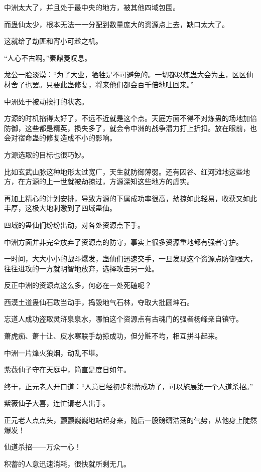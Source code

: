 \begin{this_body}
中洲太大了，并且处于最中央的地方，被其他四域包围。

而蛊仙太少，根本无法一一分配到数量庞大的资源点上去，缺口太大了。

这就给了劫匪和宵小可趁之机。

“人心不古啊。”秦鼎菱叹息。

龙公一脸淡漠：“为了大业，牺牲是不可避免的。一切都以炼蛊大会为主，区区仙材舍了也罢。只要此蛊修复，将来他们都会百千倍地吐回来。”

中洲处于被动挨打的状态。

方源的时机掐得太好了，不远不近就是这个点。天庭方面不得不对炼蛊的场地加倍防御，这些都是精英，损失多了，就会令中洲的战争潜力打上折扣。放在眼前，也会对宿命蛊的修复造成不小的影响。

方源选取的目标也很巧妙。

比如玄武山脉这种地形太过宽广，天生就防御薄弱。还有囚谷、红河滩地这些地方，在方源的上一世就被劫掠过，方源深知这些地方的虚实。

再加上精心的计划安排，导致方源的下属成功率很高，劫掠如此轻易，收获又如此丰厚，这极大地刺激到了四域蛊仙。

四域的蛊仙们纷纷出动，对各处资源点下手。

中洲方面并非完全放弃了资源点的防守，事实上很多资源重地都有强者守护。

一时间，大大小小的战斗爆发，蛊仙们迅速交手，一旦发现这个资源点防御强大，往往进攻的一方就明智地放弃，选择攻击另一处。

反正中洲的资源点这么多，何必在一处死磕呢？

西漠土道蛊仙石敢当动手，捣毁地气石林，夺取大批圆坤石。

忘道人成功盗取灵浒泉泉水，哪怕这个资源点有古魂门的强者杨峰亲自镇守。

萧虎痴、萧十让、皮水寒联手劫掠成功，但分赃不均，相互拼斗起来。

中洲一片烽火狼烟，动乱不堪。

紫薇仙子守在天庭中，简直是度日如年。

终于，正元老人开口道：“人意已经初步积蓄成功了，可以施展第一个人道杀招。”

紫薇仙子大喜，连忙请老人出手。

正元老人点点头，颤颤巍巍地站起身来，随后一股磅礴浩荡的气势，从他身上陡然爆发！

仙道杀招——万众一心！

积蓄的人意迅速消耗，很快就所剩无几。


\end{this_body}
